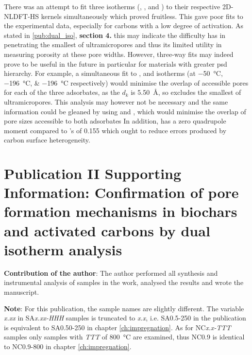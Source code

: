 There was an attempt to fit three isotherms (, , and ) to their respective 2D-NLDFT-HS kernels simultaneously which proved fruitless. This gave poor fits to the experimental data, especially for carbons with a low degree of activation. As stated in \ref{pub:dual_iso}, \textbf{section 4.} this may indicate the difficulty  has in penetrating the smallest of \glspl{ultramicropore} and thus its limited utility in measuring porosity at these pore widths. However, three-way fits may indeed prove to be useful in the future in particular for materials with greater \acrshort{psd} hierarchy. For example, a simultaneous fit to ,  and  isotherms (at \qtylist[list-units=single]{-50;-196;-196}{\degreeCelsius} respectively) would minimise the overlap of accessible pores for each of the three \glspl{adsorbate}, as the $d_k$ is \qty{5.50}{\angstrom}, so excludes the smallest of \glspl{ultramicropore}. This analysis may however not be necessary and the same information could be gleaned by using  and , which would minimise the overlap of pore sizes accessible to both \glspl{adsorbate} In addition,  has a zero quadrupole moment compared to 's of 0.155 which ought to reduce errors produced by carbon surface heterogeneity.


\newpage
\section[Publication II Supporting Information]{Publication II Supporting Information: Confirmation of pore formation mechanisms in biochars and activated carbons by dual isotherm analysis}

\textbf{Contribution of the author}: The author performed all synthesis and instrumental analysis of samples in the work, analysed the results and wrote the manuscript.

\textbf{Note}: For this publication, the sample names are slightly different. The variable \textit{x.xx} in SA\textit{x.xx-HHH} samples is truncated to \textit{x.x}, i.e. SA0.5-250 in the publication is equivalent to SA0.50-250 in chapter \ref{ch:impregnation}. As for NC\textit{x.x-TTT} samples only samples with \textit{TTT} of \qty{800}{\degreeCelsius} are examined, thus NC0.9 is identical to NC0.9-800 in chapter \ref{ch:impregnation}.
\setcounter{opagenum}{\thepage}
\newpage

\setlength{\originalVOffset}{\voffset}   
\setlength{\originalHOffset}{\hoffset}

\setlength{\voffset}{0cm}
\setlength{\hoffset}{0cm}

\setlength{\voffset}{\originalVOffset}
\setlength{\hoffset}{\originalHOffset}


